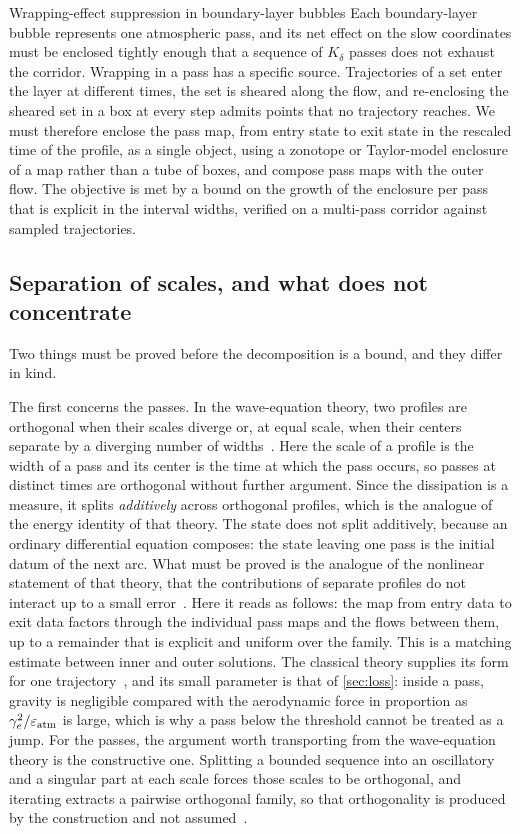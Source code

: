 \documentclass[english,11pt]{extarticle}
\begin{document}
\begin{openitem}{Wrapping-effect suppression in boundary-layer bubbles}
\label{obj:passmaps}
Each boundary-layer bubble represents one atmospheric pass, and its net
effect on the slow coordinates must be enclosed tightly enough that a
sequence of $K_\delta$ passes does not exhaust the corridor. Wrapping in a
pass has a specific source. Trajectories of a set enter the layer at
different times, the set is sheared along the flow, and re-enclosing the
sheared set in a box at every step admits points that no trajectory reaches.
We must therefore enclose the pass map, from entry state to exit state in
the rescaled time of the profile, as a single object, using a zonotope or
Taylor-model enclosure of a map rather than a tube of boxes, and compose
pass maps with the outer flow. The objective is met by a bound on the growth
of the enclosure per pass that is explicit in the interval widths, verified
on a multi-pass corridor against sampled trajectories.
\end{openitem}

\subsection{Separation of scales, and what does not concentrate}
\label{sec:composition}
Two things must be proved before the decomposition is a bound, and they
differ in kind.

The first concerns the passes. In the wave-equation theory, two profiles are
orthogonal when their scales diverge or, at equal scale, when their centers
separate by a diverging number of widths~\cite[(1.18)]{bahouri1999high}.
Here the scale of a profile is the width of a pass and its center is the
time at which the pass occurs, so passes at distinct times are orthogonal
without further argument. Since the dissipation is a measure, it splits
\emph{additively} across orthogonal profiles, which is the analogue of the
energy identity of that theory. The state does not split additively, because
an ordinary differential equation composes: the state leaving one pass is
the initial datum of the next arc. What must be proved is the analogue of
the nonlinear statement of that theory, that the contributions of separate
profiles do not interact up to a small
error~\cite[(1.26)]{bahouri1999high}. Here it reads as follows: the map from
entry data to exit data factors through the individual pass maps and the
flows between them, up to a remainder that is explicit and uniform over the
family. This is a matching estimate between inner and outer solutions. The
classical theory supplies its form for one
trajectory~\cite{shi1971skip,kuo1995improved}, and its small parameter is
that of \cref{sec:loss}: inside a pass, gravity is negligible compared with
the aerodynamic force in proportion as $\gamma_e^2/\varepsilon_{\mathrm{atm}}$ is
large, which is why a pass below the threshold cannot be treated as a jump.
For the passes, the argument worth transporting from the wave-equation
theory is the constructive one. Splitting a bounded sequence into an
oscillatory and a singular part at each scale forces those scales to be
orthogonal, and iterating extracts a pairwise orthogonal family, so that
orthogonality is produced by the construction and not
assumed~\cite{bahouri1999high}.
\end{document}
